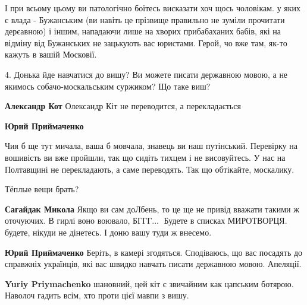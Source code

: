 \begin{itemize}
\begin{itemize}
І при всьому цьому ви патологічно боїтесь висказати хоч щось чоловікам. у яких
є влада - Бужанським (ви навіть це прізвище правильно не зуміли прочитати
дерєавною) і іншим, нападаючи лише на хворих прибабаханих бабів, які на відміну
від Бужанських не зацькують вас юристами. Герой, чо вже там, як-то кажуть в
вашій Московії.

4. Донька йде навчатися до вишу? Ви можете писати державною мовою, а не якимось
собачо-москальським суржиком? Що таке виш?


\textbf{Александр Кот} Олександр Кіт не переводится, а перекладається



\textbf{Юрий Приймаченко} 

Чия б ще тут мичала, ваша б мовчала, знавець ви наш путінський. Перевірку на
вошивість ви вже пройшли, так що сидіть тихцем і не висовуйтесь. У нас на
Полтавщині не перекладають, а саме переводять. Так що обтікайте, москалику.


Тёплые вещи брать?


\textbf{Сагайдак Микола} Якщо ви сам доЛбень, то це ще не привід вважати такими
ж оточуючих. В гирлі воно воювало, БГГГ...🤣 Будете в списках МИРОТВОРЦЯ.
будете, нікуди не дінетесь. І доню вашу туди ж внесемо.



\textbf{Юрий Приймаченко} Беріть, в камері згодяться. Сподіваюсь, що вас
посадять до справжніх українців, які вас швидко навчать писати державною мовою.
Апеляції.



\textbf{Yuriy Priymachenko} шановний, цей кіт є звичайним как цапським ботярою.
Наволоч гадить всім, хто проти цієї мавпи з вишу.


\end{itemize}
\end{itemize}
